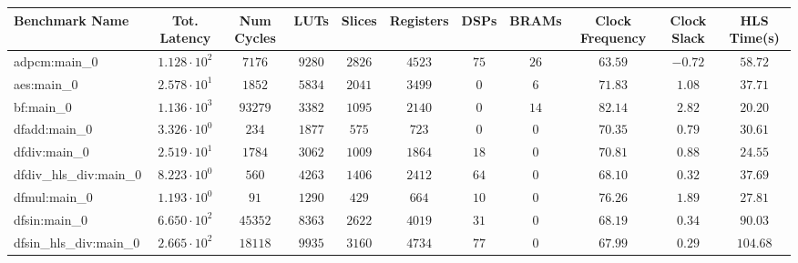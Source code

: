 \begin{tabular}{|l|c|c|c|c|c|c|c|c|c|c|}
\hline
Benchmark Name          & Tot. Latency           & Num Cycles & LUTs      & Slices    & Registers & DSPs    & BRAMs   & Clock Frequency & Clock Slack & HLS Time(s) \\
\hline
adpcm:main\_0           & $ 1.128 \cdot 10^{2} $ & $ 7176   $ & $ 9280  $ & $ 2826  $ & $ 4523  $ & $ 75  $ & $ 26  $ & $ 63.59       $ & $ -0.72   $ & $ 58.72   $ \\
aes:main\_0             & $ 2.578 \cdot 10^{1} $ & $ 1852   $ & $ 5834  $ & $ 2041  $ & $ 3499  $ & $ 0   $ & $ 6   $ & $ 71.83       $ & $ 1.08    $ & $ 37.71   $ \\
bf:main\_0              & $ 1.136 \cdot 10^{3} $ & $ 93279  $ & $ 3382  $ & $ 1095  $ & $ 2140  $ & $ 0   $ & $ 14  $ & $ 82.14       $ & $ 2.82    $ & $ 20.20   $ \\
dfadd:main\_0           & $ 3.326 \cdot 10^{0} $ & $ 234    $ & $ 1877  $ & $ 575   $ & $ 723   $ & $ 0   $ & $ 0   $ & $ 70.35       $ & $ 0.79    $ & $ 30.61   $ \\
dfdiv:main\_0           & $ 2.519 \cdot 10^{1} $ & $ 1784   $ & $ 3062  $ & $ 1009  $ & $ 1864  $ & $ 18  $ & $ 0   $ & $ 70.81       $ & $ 0.88    $ & $ 24.55   $ \\
dfdiv\_hls\_div:main\_0 & $ 8.223 \cdot 10^{0} $ & $ 560    $ & $ 4263  $ & $ 1406  $ & $ 2412  $ & $ 64  $ & $ 0   $ & $ 68.10       $ & $ 0.32    $ & $ 37.69   $ \\
dfmul:main\_0           & $ 1.193 \cdot 10^{0} $ & $ 91     $ & $ 1290  $ & $ 429   $ & $ 664   $ & $ 10  $ & $ 0   $ & $ 76.26       $ & $ 1.89    $ & $ 27.81   $ \\
dfsin:main\_0           & $ 6.650 \cdot 10^{2} $ & $ 45352  $ & $ 8363  $ & $ 2622  $ & $ 4019  $ & $ 31  $ & $ 0   $ & $ 68.19       $ & $ 0.34    $ & $ 90.03   $ \\
dfsin\_hls\_div:main\_0 & $ 2.665 \cdot 10^{2} $ & $ 18118  $ & $ 9935  $ & $ 3160  $ & $ 4734  $ & $ 77  $ & $ 0   $ & $ 67.99       $ & $ 0.29    $ & $ 104.68  $ \\

\end{tabular}
